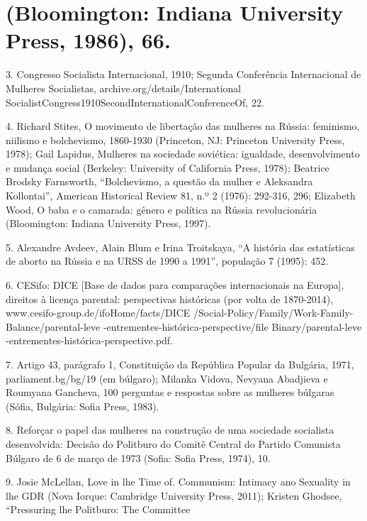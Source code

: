 \section{(Bloomington: Indiana University Press, 1986), 66.}
 \par 
3. Congresso Socialista Internacional, 1910; Segunda Conferência Internacional de Mulheres Socialistas, archive.org/details/International SocialistCongress1910SecondInternationalConferenceOf, {\color{blue}22}.
 \par 
4. Richard Stites, O movimento de libertação das mulheres na Rússia: feminismo, niilismo e bolchevismo, 1860-1930 (Princeton, NJ: Princeton University Press, 1978); Gail Lapidus, Mulheres na sociedade soviética: igualdade, desenvolvimento e mudança social (Berkeley: University of California Press, 1978); Beatrice Brodsky Farnsworth, “Bolchevismo, a questão da mulher e Aleksandra Kollontai”, American Historical Review 81, n.º {\color{blue}2} (1976): 292-316, 296; Elizabeth Wood, O baba e o camarada: gênero e política na Rússia revolucionária (Bloomington: Indiana University Press, 1997).
 \par 
5. Alexandre Avdeev, Alain Blum e Irina Troitskaya, “A história das estatísticas de aborto na Rússia e na URSS de 1990 a 1991”, população {\color{blue}7} (1995): {\color{blue}452}.
 \par 
6. CESifo: DICE [Base de dados para comparações internacionais na Europa], direitos à licença parental: perspectivas históricas (por volta de 1870-2014), www.cesifo-group.de/ifoHome/facts/DICE /Social-Policy/Family/Work-Family-Balance/parental-leve -entrementes-histórica-perspective/file Binary/parental-leve -entrementes-histórica-perspective.pdf.
 \par 
7. Artigo 43, parágrafo 1, Constituição da República Popular da Bulgária, 1971, parliament.bg/bg/19 (em búlgaro); Milanka Vidova, Nevyana Abadjieva e Roumyana Gancheva, {\color{blue}100} perguntas e respostas sobre as mulheres búlgaras (Sófia, Bulgária: Sofia Press, 1983).
 \par 
8. Reforçar o papel das mulheres na construção de uma sociedade socialista desenvolvida: Decisão do Politburo do Comitê Central do Partido Comunista Búlgaro de {\color{blue}6} de março de 1973 (Sofia: Sofia Press, 1974), {\color{blue}10}.
 \par 
9. Josie McLellan, Love in lhe Time of. Communism: Intimacy ano Sexuality in lhe GDR (Nova Iorque: Cambridge University Press, 2011); Kristen Ghodsee, “Pressuring lhe Politburo: The Committee
 \par 
